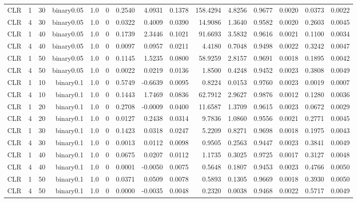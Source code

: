 \begin{longtable}{rrrrrrrrrrrrrrr}
  CLR & 1 & 30 & binary0.05 & 1.0 & 0 & 0.2540 & 4.0931 & 0.1378 & 158.4294 & 4.8256 & 0.9677 & 0.0020 & 0.0373 & 0.0022 \\ 
  CLR & 4 & 30 & binary0.05 & 1.0 & 0 & 0.0322 & 0.4009 & 0.0390 & 14.9086 & 1.3640 & 0.9582 & 0.0020 & 0.2603 & 0.0045 \\ 
  CLR & 1 & 40 & binary0.05 & 1.0 & 0 & 0.1739 & 2.3446 & 0.1021 & 91.6693 & 3.5832 & 0.9616 & 0.0021 & 0.1100 & 0.0034 \\ 
  CLR & 4 & 40 & binary0.05 & 1.0 & 0 & 0.0097 & 0.0957 & 0.0211 & 4.4180 & 0.7048 & 0.9498 & 0.0022 & 0.3242 & 0.0047 \\ 
  CLR & 1 & 50 & binary0.05 & 1.0 & 0 & 0.1145 & 1.5235 & 0.0800 & 58.9259 & 2.8157 & 0.9691 & 0.0018 & 0.1895 & 0.0042 \\ 
  CLR & 4 & 50 & binary0.05 & 1.0 & 0 & 0.0022 & 0.0219 & 0.0136 & 1.8500 & 0.4248 & 0.9452 & 0.0023 & 0.3808 & 0.0049 \\ 
  CLR & 1 & 10 & binary0.1 & 1.0 & 0 & 0.5749 & -0.6639 & 0.0095 & 0.8224 & 0.0153 & 0.9760 & 0.0023 & 0.0019 & 0.0007 \\ 
  CLR & 4 & 10 & binary0.1 & 1.0 & 0 & 0.1443 & 1.7469 & 0.0836 & 62.7912 & 2.9627 & 0.9876 & 0.0012 & 0.1280 & 0.0036 \\ 
  CLR & 1 & 20 & binary0.1 & 1.0 & 0 & 0.2708 & -0.0009 & 0.0400 & 11.6587 & 1.3709 & 0.9615 & 0.0023 & 0.0672 & 0.0029 \\ 
  CLR & 4 & 20 & binary0.1 & 1.0 & 0 & 0.0127 & 0.2438 & 0.0314 & 9.7836 & 1.0860 & 0.9556 & 0.0021 & 0.2771 & 0.0045 \\ 
  CLR & 1 & 30 & binary0.1 & 1.0 & 0 & 0.1423 & 0.0318 & 0.0247 & 5.2209 & 0.8271 & 0.9698 & 0.0018 & 0.1975 & 0.0043 \\ 
  CLR & 4 & 30 & binary0.1 & 1.0 & 0 & 0.0013 & 0.0112 & 0.0098 & 0.9505 & 0.2563 & 0.9447 & 0.0023 & 0.3841 & 0.0049 \\ 
  CLR & 1 & 40 & binary0.1 & 1.0 & 0 & 0.0675 & 0.0207 & 0.0112 & 1.1735 & 0.3025 & 0.9725 & 0.0017 & 0.3127 & 0.0048 \\ 
  CLR & 4 & 40 & binary0.1 & 1.0 & 0 & 0.0001 & -0.0050 & 0.0075 & 0.5648 & 0.1807 & 0.9453 & 0.0023 & 0.4766 & 0.0050 \\ 
  CLR & 1 & 50 & binary0.1 & 1.0 & 0 & 0.0371 & 0.0509 & 0.0078 & 0.5893 & 0.1305 & 0.9669 & 0.0018 & 0.3930 & 0.0050 \\ 
  CLR & 4 & 50 & binary0.1 & 1.0 & 0 & 0.0000 & -0.0035 & 0.0048 & 0.2320 & 0.0038 & 0.9468 & 0.0022 & 0.5717 & 0.0049 \\ 

\end{longtable}
